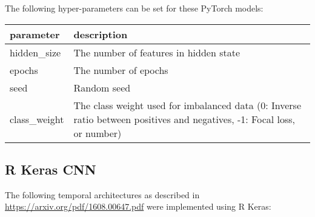 \documentclass[]{article}
\begin{document}
The following hyper-parameters can be set for these PyTorch models:

\begin{longtable}[]{@{}ll@{}}
\toprule
\begin{minipage}[b]{0.14\columnwidth}\raggedright\strut
parameter\strut
\end{minipage} & \begin{minipage}[b]{0.35\columnwidth}\raggedright\strut
description\strut
\end{minipage}\tabularnewline
\midrule
\endhead
\begin{minipage}[t]{0.14\columnwidth}\raggedright\strut
hidden\_size\strut
\end{minipage} & \begin{minipage}[t]{0.35\columnwidth}\raggedright\strut
The number of features in hidden state\strut
\end{minipage}\tabularnewline
\begin{minipage}[t]{0.14\columnwidth}\raggedright\strut
epochs\strut
\end{minipage} & \begin{minipage}[t]{0.35\columnwidth}\raggedright\strut
The number of epochs\strut
\end{minipage}\tabularnewline
\begin{minipage}[t]{0.14\columnwidth}\raggedright\strut
seed\strut
\end{minipage} & \begin{minipage}[t]{0.35\columnwidth}\raggedright\strut
Random seed\strut
\end{minipage}\tabularnewline
\begin{minipage}[t]{0.14\columnwidth}\raggedright\strut
class\_weight\strut
\end{minipage} & \begin{minipage}[t]{0.35\columnwidth}\raggedright\strut
The class weight used for imbalanced data (0: Inverse ratio between
positives and negatives, -1: Focal loss, or number)\strut
\end{minipage}\tabularnewline
\bottomrule
\end{longtable}

\newpage

\subsection{R Keras CNN}\label{r-keras-cnn}

The following temporal architectures as described in
\url{https://arxiv.org/pdf/1608.00647.pdf} were implemented using R
Keras:
\end{document}

